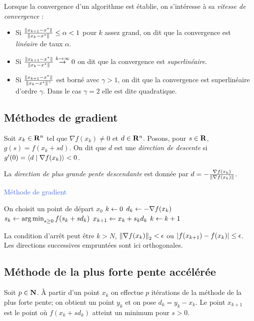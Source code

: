 	Lorsque la convergence d'un algorithme est établie, on s'intéresse à sa \emph{vitesse de convergence} :
	\begin{itemize}
		\item[\textbullet] Si $\frac{\left\lVert x_{k + 1} - x^*\right\rVert}{\left\lVert x_k - x^*\right\rVert} \leq \alpha < 1$ pour $k$ assez grand, on dit que la convergence est \emph{linéaire} de taux $\alpha$.
		\item[\textbullet] Si $\frac{\left\lVert x_{k + 1} - x^*\right\rVert}{\left\lVert x_k - x^*\right\rVert} \overset{k \to \infty}{\to} 0$ on dit que la convergence est \emph{superlinéaire}.
		\item[\textbullet] Si $\frac{\left\lVert x_{k + 1} - x^*\right\rVert}{\left\lVert x_k - x^*\right\rVert^\gamma}$ est borné avec $\gamma > 1$, on dit que la convergence est superlinéaire d'ordre $\gamma$. Dans le cas $\gamma = 2$ elle est dite quadratique.
	\end{itemize}


\subsection{Méthodes de gradient}

	Soit $x_k \in \mathbf{R}^n$ tel que $\nabla f(x_k) \neq 0$ et $d \in \mathbf{R}^n$.
	Posons, pour $s \in \mathbf{R}$, $g(s) = f(x_k + sd)$.
	On dit que $d$ est une \emph{direction de descente} si $g'(0) = \left\langle d \mid \nabla f(x_k) \right\rangle < 0$.

	La \emph{direction de plus grande pente descendante} est donnée par $d = - \frac{\nabla f(x_k)}{\left\lVert\nabla f(x_k)\right\rVert}$.
	
	\begin{algorithm}[h]
		\caption{\textcolor{RoyalBlue}{Méthode de gradient}}
		On choisit un point de départ $x_0$ \;
		$k \leftarrow 0$ \;
		{
			$d_k \leftarrow - \nabla f(x_k)$ \;
			$s_k \leftarrow \operatorname{arg\, min}_{s \geq 0} f(s_k + s d_k)$ \;
			$x_{k + 1} \leftarrow x_k + s_k d_k$ \;
			$k \leftarrow k + 1$ \;
		}
	\end{algorithm}

	La condition d'arrêt peut être $k > N$, $\left\lVert\nabla f(x_k)\right\rVert_2 < \epsilon$ ou $\left\lvert f(x_{k + 1}) - f(x_k)\right\rvert \leq \epsilon$.
	Les directions successives empruntées sont ici orthogonales.


\subsection{Méthode de la plus forte pente accélérée}

	Soit $p \in \mathbf{N}$.
	À partir d'un point $x_k$ on effectue $p$ itérations de la méthode de la plus forte pente; on obtient un point $y_k$ et on pose $d_k = y_k - x_k$.
	Le point $x_{k + 1}$ est le point où $f(x_k + s d_k)$ atteint un minimum pour $s > 0$.


